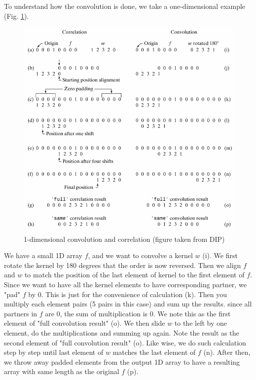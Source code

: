 To understand how the convolution is done, we take a one-dimensional
example (Fig. \ref{fig:img39}).


\begin{figure}[htbp]
\begin{center}
\includegraphics[width=11.718cm]{fig/CMCIBasicCourse201102-img39.png}
\caption{ 1-dimensional convolution and correlation (figure taken from DIP)}
\label{fig:img39}
\end{center}
\end{figure}

We have a small 1D array $f$, and we want to convolve a
kernel $w$ (i). We first rotate the kernel by 180 degrees that
the order is now reversed. Then we align $f$ and $w$ to
match the position of the last element of kernel to the first element
of $f$. Since we want to have all the kernel elements to have
corresponding partner, we "pad" $f$ by 0.
This is just for the convenience of calculation (k). Then you multiply
each element pairs (5 pairs in this case) and sum up the results. since
all partners in $f$ are 0, the sum of multiplication is 0. We note this
as the first element of "full convolution
result" (o). We then slide $w$ to the left by one
element, do the multiplications and summing up again. Note the result
as the second element of "full convolution
result" (o). Like wise, we do such calculation step by
step until last element of $w$ matches the last element of
$f$ (n). After then, we throw away padded elements from the
output 1D array to have a resulting array with same length as the
original $f$ (p). 

